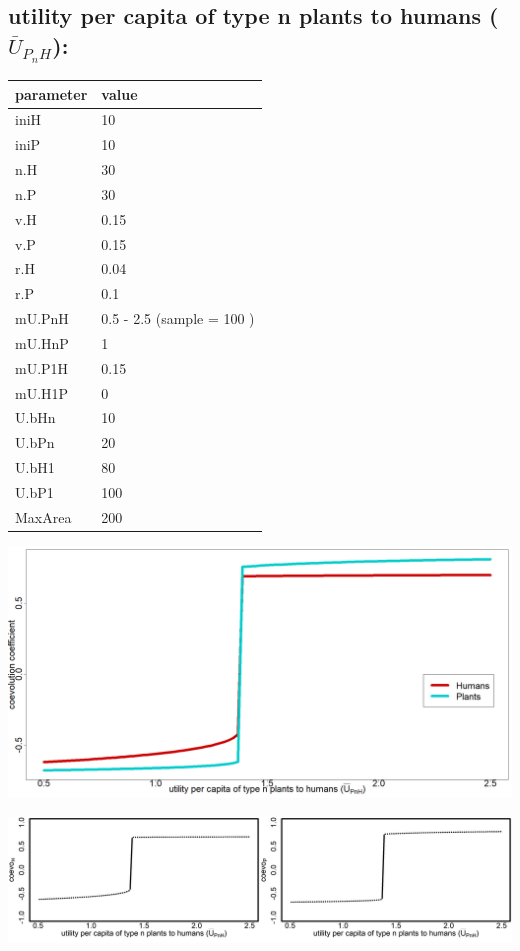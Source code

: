 \documentclass[]{book}
\begin{document}
\hypertarget{utility-per-capita-of-type-n-plants-to-humans-baru_p_nh}{%
\subsection{\texorpdfstring{utility per capita \textbf{of} type n plants \textbf{to} humans (\(\bar{U}_{P_{n}H}\)):}{utility per capita of type n plants to humans (\textbackslash{}bar\{U\}\_\{P\_\{n\}H\}):}}\label{utility-per-capita-of-type-n-plants-to-humans-baru_p_nh}}

\begin{tabular}{l|l}
\hline
parameter & value\\
\hline
iniH & 10\\
\hline
iniP & 10\\
\hline
n.H & 30\\
\hline
n.P & 30\\
\hline
v.H & 0.15\\
\hline
v.P & 0.15\\
\hline
r.H & 0.04\\
\hline
r.P & 0.1\\
\hline
mU.PnH & 0.5 - 2.5 (sample = 100 )\\
\hline
mU.HnP & 1\\
\hline
mU.P1H & 0.15\\
\hline
mU.H1P & 0\\
\hline
U.bHn & 10\\
\hline
U.bPn & 20\\
\hline
U.bH1 & 80\\
\hline
U.bP1 & 100\\
\hline
MaxArea & 200\\
\hline
\end{tabular}

\includegraphics[width=1\linewidth]{plots/2_onePar-mU.PnH_ggbifplot}

\includegraphics[width=1\linewidth]{plots/2_onePar-mU.PnH_bifplot-pair}
\end{document}
